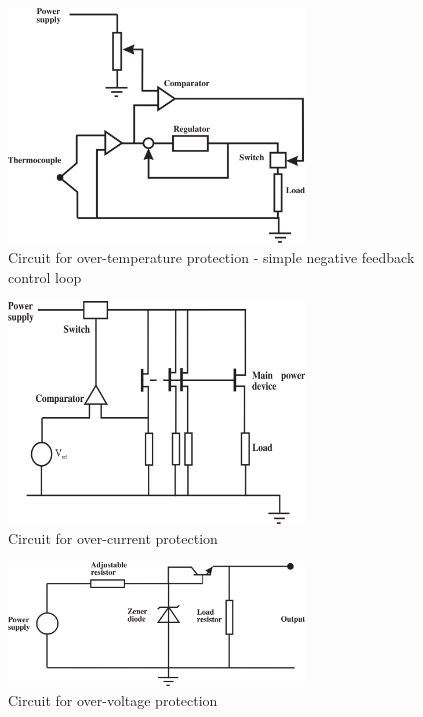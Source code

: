 \documentclass[10pt,a4paper]{article}
\begin{document}
\begin{figure}[h!]
	\centering
	\includegraphics[width=0.7\textwidth]{over-temp.png}
	\caption{Circuit for over-temperature protection - simple negative feedback control loop}
\end{figure}

\begin{figure}[h!]
	\centering
	\includegraphics[width=0.7\textwidth]{over-cur.png}
	\caption{Circuit for over-current protection}
\end{figure}

\begin{figure}[h!]
	\centering
	\includegraphics[width=0.7\textwidth]{over-volt.png}
	\caption{Circuit for over-voltage protection}
\end{figure}
\end{document}

